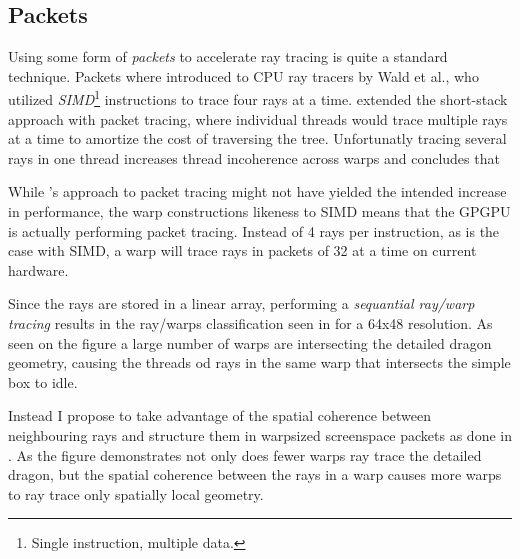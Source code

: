 \subsection{Packets}


Using some form of \textit{packets} to accelerate ray tracing is quite
a standard technique. Packets where introduced to CPU ray tracers by
Wald et al., who utilized
\textit{SIMD}\footnote{Single instruction, multiple data.}
instructions to trace four rays at a time. \horn{} extended the
short-stack approach with packet tracing, where individual threads
would trace multiple rays at a time to amortize the cost of traversing
the tree. Unfortunatly tracing several rays in one thread increases
thread incoherence across warps and \aila{} concludes that




While \horn's approach to packet tracing might not have yielded the
intended increase in performance, the warp constructions likeness to
SIMD means that the GPGPU is actually performing packet tracing.
Instead of 4 rays per instruction, as is the case with SIMD, a warp
will trace rays in packets of 32 at a time on current hardware.

Since the rays are stored in a linear array, performing a
\textit{sequantial ray/warp tracing} results in the ray/warps
classification seen in  for a 64x48
resolution. As seen on the figure a large number of warps are
intersecting the detailed dragon geometry, causing the threads od rays
in the same warp that intersects the simple box to idle.

Instead I propose to take advantage of the spatial coherence between
neighbouring rays and structure them in warpsized screenspace packets
as done in . As the figure demonstrates
not only does fewer warps ray trace the detailed dragon, but the
spatial coherence between the rays in a warp causes more warps to ray
trace only spatially local geometry.


